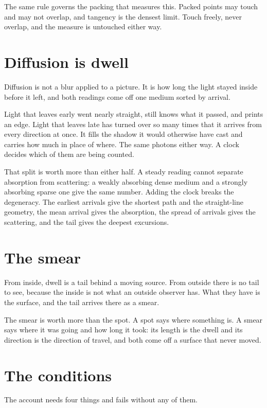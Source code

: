 The same rule governs the packing that measures this. Packed points may touch and may not overlap, and tangency is the densest limit. Touch freely, never overlap, and the measure is untouched either way.

\section{Diffusion is dwell}

Diffusion is not a blur applied to a picture. It is how long the light stayed inside before it left, and both readings come off one medium sorted by arrival.

Light that leaves early went nearly straight, still knows what it passed, and prints an edge. Light that leaves late has turned over so many times that it arrives from every direction at once. It fills the shadow it would otherwise have cast and carries how much in place of where. The same photons either way. A clock decides which of them are being counted.

That split is worth more than either half. A steady reading cannot separate absorption from scattering: a weakly absorbing dense medium and a strongly absorbing sparse one give the same number. Adding the clock breaks the degeneracy. The earliest arrivals give the shortest path and the straight-line geometry, the mean arrival gives the absorption, the spread of arrivals gives the scattering, and the tail gives the deepest excursions.

\section{The smear}

From inside, dwell is a tail behind a moving source. From outside there is no tail to see, because the inside is not what an outside observer has. What they have is the surface, and the tail arrives there as a smear.

The smear is worth more than the spot. A spot says where something is. A smear says where it was going and how long it took: its length is the dwell and its direction is the direction of travel, and both come off a surface that never moved.

\section{The conditions}

The account needs four things and fails without any of them.


